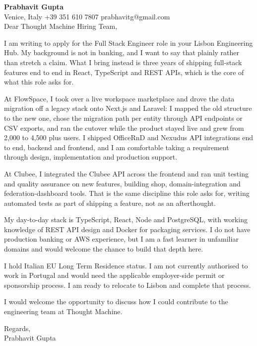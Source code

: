 \documentclass[a4paper,10.5pt]{article}
\begin{document}
\textbf{Prabhavit Gupta}\\
Venice, Italy \textbar{} +39 351 610 7807 \textbar{} prabhavitg@gmail.com\\[10pt]
Dear Thought Machine Hiring Team,

I am writing to apply for the Full Stack Engineer role in your Lisbon Engineering Hub. My background is not in banking, and I want to say that plainly rather than stretch a claim. What I bring instead is three years of shipping full-stack features end to end in React, TypeScript and REST APIs, which is the core of what this role asks for.

At FlowSpace, I took over a live workspace marketplace and drove the data migration off a legacy stack onto Next.js and Laravel: I mapped the old structure to the new one, chose the migration path per entity through API endpoints or CSV exports, and ran the cutover while the product stayed live and grew from 2,000 to 4,500 plus users. I shipped OfficeRnD and Nexudus API integrations end to end, backend and frontend, and I am comfortable taking a requirement through design, implementation and production support.

At Clubee, I integrated the Clubee API across the frontend and ran unit testing and quality assurance on new features, building shop, domain-integration and federation-dashboard tools. That is the same discipline this role asks for, writing automated tests as part of shipping a feature, not as an afterthought.

My day-to-day stack is TypeScript, React, Node and PostgreSQL, with working knowledge of REST API design and Docker for packaging services. I do not have production banking or AWS experience, but I am a fast learner in unfamiliar domains and would welcome the chance to build that depth here.

I hold Italian EU Long Term Residence status. I am not currently authorised to work in Portugal and would need the applicable employer-side permit or sponsorship process. I am ready to relocate to Lisbon and complete that process.

I would welcome the opportunity to discuss how I could contribute to the engineering team at Thought Machine.

Regards,\\
Prabhavit Gupta
\end{document}
